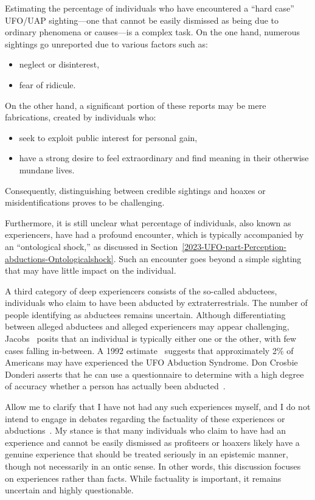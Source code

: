 Estimating the percentage of individuals who have encountered a ``hard case'' UFO/UAP sighting---one that cannot be easily dismissed as being due to ordinary phenomena or causes---is a complex task. On the one hand, numerous sightings go unreported due to various factors such as:
\begin{itemize} 
\item neglect or disinterest, 
\item fear of ridicule. 
\end{itemize}
On the other hand, a significant portion of these reports may be mere fabrications, created by individuals who:
\begin{itemize} 
\item seek to exploit public interest for personal gain, 
\item have a strong desire to feel extraordinary and find meaning in their otherwise mundane lives. 
\end{itemize}
Consequently, distinguishing between credible sightings and hoaxes or misidentifications proves to be challenging.

Furthermore, it is still unclear what percentage of individuals, also known as experiencers, have had a profound encounter, which is typically accompanied by an ``ontological shock,'' as discussed in Section~\ref{2023-UFO-part-Perception-abductions-Ontologicalshock}. Such an encounter goes beyond a simple sighting that may have little impact on the individual.

A third category of deep experiencers consists of the so-called abductees, individuals who claim to have been abducted by extraterrestrials. The number of people identifying as abductees remains uncertain. Although differentiating between alleged abductees and alleged experiencers may appear challenging, Jacobs~\cite{Jacobs2015Oct} posits that an individual is typically either one or the other, with few cases falling in-between. A 1992 estimate~\cite{HJW1992,Donderi2013Mar} suggests that approximately 2{\%} of Americans may have experienced the UFO Abduction Syndrome. Don Crosbie Donderi asserts that he can use a questionnaire to determine with a high degree of accuracy whether a person has actually been abducted~\cite{Donderi2013Jun}.

Allow me to clarify that I have not had any such experiences myself, and I do not intend to engage in debates regarding the factuality of these experiences or abductions~\cite{Sagan1997Feb}. My stance is that many individuals who claim to have had an experience and cannot be easily dismissed as profiteers or hoaxers likely have a genuine experience that should be treated seriously in an epistemic manner, though not necessarily in an ontic sense. In other words, this discussion focuses on experiences rather than facts. While factuality is important, it remains uncertain and highly questionable.

